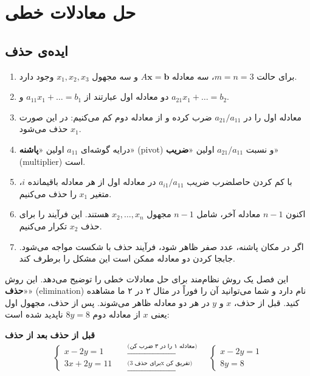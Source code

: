 \documentclass[12pt, a4paper]{book}
\theoremstyle{translator}
\begin{document}
	
	\onehalfspacing
	
	\chapter{حل معادلات خطی}
	
	\section{ایده‌ی حذف}
	
	\begin{enumerate}
		\item برای حالت $m = n = 3$، سه معادله $A\mathbf{x}=\mathbf{b}$ و سه مجهول $x_1, x_2, x_3$ وجود دارد.
		\item دو معادله اول عبارتند از $a_{11}x_1 + \dots = b_1$ و $a_{21}x_1 + \dots = b_2$.
		\item معادله اول را در $a_{21}/a_{11}$ ضرب کرده و از معادله دوم کم می‌کنیم: در این صورت $x_1$ حذف می‌شود.
		\item درایه گوشه‌ای $a_{11}$ اولین «\textbf{پاشنه}» (pivot) و نسبت $a_{21}/a_{11}$ اولین «\textbf{ضریب}» (multiplier) است.
		\item با کم کردن حاصلضرب ضریب $a_{i1}/a_{11}$ در معادله اول از هر معادله باقیمانده $i$، متغیر $x_1$ را حذف می‌کنیم.
		\item اکنون $n-1$ معادله آخر، شامل $n-1$ مجهول $x_2, \dots, x_n$ هستند. این فرآیند را برای حذف $x_2$ تکرار می‌کنیم.
		\item اگر در مکان پاشنه، عدد صفر ظاهر شود، فرآیند حذف با شکست مواجه می‌شود. جابجا کردن دو معادله ممکن است این مشکل را برطرف کند.
	\end{enumerate}
	
	این فصل یک روش نظام‌مند برای حل معادلات خطی را توضیح می‌دهد. این روش «\textbf{حذف}» (elimination) نام دارد و شما می‌توانید آن را فوراً در مثال ۲ در ۲ ما مشاهده کنید. قبل از حذف، $x$ و $y$ در هر دو معادله ظاهر می‌شوند. پس از حذف، مجهول اول یعنی $x$ از معادله دوم $8y=8$ ناپدید شده است:
	
	\vspace{5mm}
	\textbf{قبل از حذف} \hspace{2cm} \textbf{بعد از حذف}
	\[
	\begin{cases}
		x - 2y = 1 \\
		3x + 2y = 11
	\end{cases}
	\quad
	\begin{array}{l}
		\xrightarrow{\text{(معادله ۱ را در ۳ ضرب کن)}} \\
		\xrightarrow{\text{(برای حذف 3x تفریق کن)}}
	\end{array}
	\quad
	\begin{cases}
		x - 2y = 1 \\
		8y = 8
	\end{cases}
	\]
	
\end{document}
